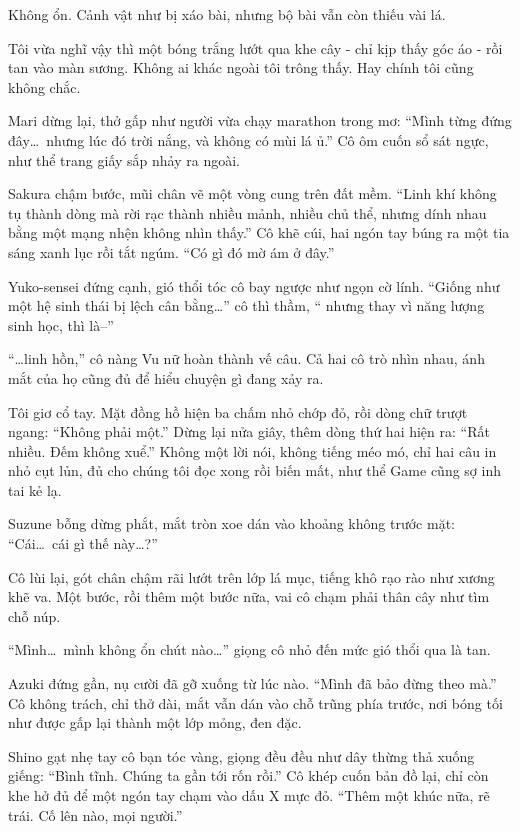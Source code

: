 \documentclass[../main.tex]{subfiles}
\begin{document}
Không ổn. Cảnh vật như bị xáo bài, nhưng bộ bài vẫn còn thiếu vài lá.

Tôi vừa nghĩ vậy thì một bóng trắng lướt qua khe cây - chỉ kịp thấy góc áo - rồi tan vào màn sương. Không ai khác ngoài tôi trông thấy. Hay chính tôi cũng không chắc.

Mari dừng lại, thở gấp như người vừa chạy marathon trong mơ: ``Mình từng đứng đây\dots\ nhưng lúc đó trời nắng, và không có mùi lá ủ.'' Cô ôm cuốn sổ sát ngực, như thể trang giấy sắp nhảy ra ngoài.

Sakura chậm bước, mũi chân vẽ một vòng cung trên đất mềm. ``Linh khí không tụ thành dòng mà rời rạc thành nhiều mảnh, nhiều chủ thể, nhưng dính nhau bằng một mạng nhện không nhìn thấy.'' Cô khẽ cúi, hai ngón tay búng ra một tia sáng xanh lục rồi tắt ngúm. ``Có gì đó mờ ám ở đây.''

Yuko-sensei đứng cạnh, gió thổi tóc cô bay ngược như ngọn cờ lính. ``Giống như một hệ sinh thái bị lệch cân bằng\dots'' cô thì thầm, `` nhưng thay vì năng lượng sinh học, thì là--''

``\dots linh hồn,'' cô nàng Vu nữ hoàn thành vế câu. Cả hai cô trò nhìn nhau, ánh mắt của họ cũng đủ để hiểu chuyện gì đang xảy ra.

Tôi giơ cổ tay. Mặt đồng hồ hiện ba chấm nhỏ chớp đỏ, rồi dòng chữ trượt ngang: ``Không phải một.'' Dừng lại nửa giây, thêm dòng thứ hai hiện ra:  ``Rất nhiều. Đếm không xuể.'' Không một lời nói, không tiếng méo mó, chỉ hai câu in nhỏ cụt lủn, đủ cho chúng tôi đọc xong rồi biến mất, như thể Game cũng sợ inh tai kẻ lạ.

Suzune bỗng dừng phắt, mắt tròn xoe dán vào khoảng không trước mặt: ``Cái\dots\ cái gì thế này\dots?''

Cô lùi lại, gót chân chậm rãi lướt trên lớp lá mục, tiếng khô rạo rào như xương khẽ va. Một bước, rồi thêm một bước nữa, vai cô chạm phải thân cây như tìm chỗ núp.

``Mình\dots\ mình không ổn chút nào\dots'' giọng cô nhỏ đến mức gió thổi qua là tan.

Azuki đứng gần, nụ cười đã gỡ xuống từ lúc nào. ``Mình đã bảo đừng theo mà.'' Cô không trách, chỉ thở dài, mắt vẫn dán vào chỗ trũng phía trước, nơi bóng tối như được gấp lại thành một lớp mỏng, đen đặc.

Shino gạt nhẹ tay cô bạn tóc vàng, giọng đều đều như dây thừng thả xuống giếng: ``Bình tĩnh. Chúng ta gần tới rốn rồi.'' Cô khép cuốn bản đồ lại, chỉ còn khe hở đủ để một ngón tay chạm vào dấu X mực đỏ. ``Thêm một khúc nữa, rẽ trái. Cố lên nào, mọi người.''
\end{document}
